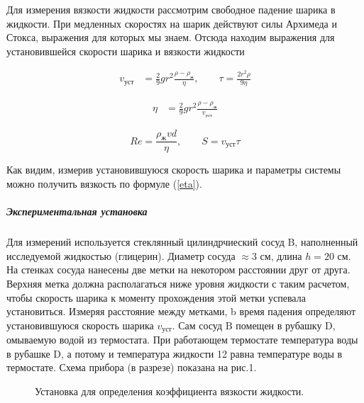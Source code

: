 \documentclass[a4paper,12pt]{article}
\begin{document}
	Для измерения вязкости жидкости рассмотрим свободное падение шарика в жидкости. При медленных скоростях на шарик действуют силы Архимеда и Стокса, выражения для которых мы знаем. Отсюда находим выражения для установившейся скорости шарика и вязкости жидкости
	
	\begin{align}
		v_{уст}&=\frac{2}{9}gr^2\frac{\rho - \rho_ж}{\eta}\label{v_ust},\qquad \tau = \frac{2r^2\rho}{9\eta}
	\end{align}

	\begin{align}
		\eta&=\frac{2}{9}gr^2\frac{\rho - \rho_ж}{v_{уст}}\label{eta}
	\end{align}

	\begin{equation*}
		Re = \dfrac{\rho_{ж} v d}{\eta}, \qquad S = v_{уст} \tau
	\end{equation*}

	Как видим, измерив установившуюся скорость шарика и параметры системы можно получить вязкость по формуле (\ref{eta}).
	
	
	\subparagraph*{Экспериментальная установка}
	Для измерений используется стеклянный цилиндрчиеский сосуд B, наполненный исследуемой жидкостью (глицерин). Диаметр сосуда $\approx 3$ см, длина $h = 20$ см. На стенках сосуда нанесены две метки на некотором расстоянии друг от друга. Верхняя метка должна располагаться ниже уровня жидкости с таким расчетом, чтобы скорость шарика к моменту прохождения этой метки успевала установиться. Измеряя расстояние между метками, b время падения определяют установившуюся скорость шарика $v_{уст}$. Сам сосуд B помещен в рубашку D, омываемую водой из термостата. При работающем термостате температура воды в рубашке D, а потому и температура жидкости 12 равна температуре воды в термостате.
	Схема прибора (в разрезе) показана на рис.1.
	
	\begin{figure}[h!]
		\caption[]{\label{fig:1} Установка для определения коэффициента вязкости жидкости.}
	\end{figure}
\end{document}
